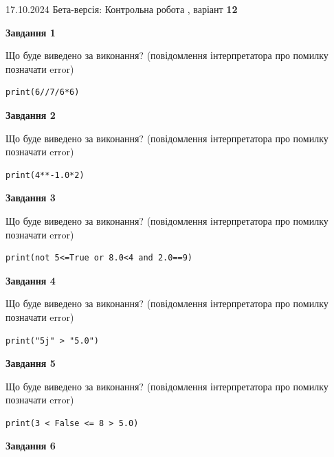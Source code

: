 \documentclass[12pt, ukrainian]{article}
\begin{document}
{\Large{17.10.2024 Бета-версія: Контрольна робота , варіант  \No \textbf { 12 }\par}}
{
\begin {large}
{\begin {center}\textbf{Завдання 1}\end {center}}

Що буде виведено за виконання? (повідомлення інтерпретатора про помилку позначати error)\par
\begin{verbatim}
print(6//7/6*6)
\end{verbatim}

{\begin {center}\textbf{Завдання 2}\end {center}}

Що буде виведено за виконання? (повідомлення інтерпретатора про помилку позначати error)\par
\begin{verbatim}
print(4**-1.0*2)
\end{verbatim}

{\begin {center}\textbf{Завдання 3}\end {center}}

Що буде виведено за виконання? (повідомлення інтерпретатора про помилку позначати error)\par
\begin{verbatim}
print(not 5<=True or 8.0<4 and 2.0==9)
\end{verbatim}

{\begin {center}\textbf{Завдання 4}\end {center}}

Що буде виведено за виконання? (повідомлення інтерпретатора про помилку позначати error)\par
\begin{verbatim}
print("5j" > "5.0")
\end{verbatim}

{\begin {center}\textbf{Завдання 5}\end {center}}

Що буде виведено за виконання? (повідомлення інтерпретатора про помилку позначати error)\par
\begin{verbatim}
print(3 < False <= 8 > 5.0)
\end{verbatim}

{\begin {center}\textbf{Завдання 6}\end {center}}


\end{large}}
\end{document}
